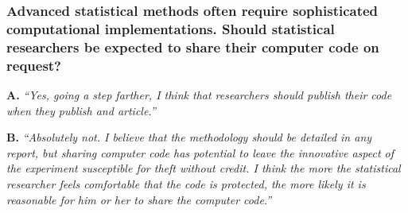 \documentclass[12pt]{beamer}
\newcommand\ans[1]{{\it ``#1''}}
\newcommand\gap{\vspace{5mm}}
\begin{document}
\begin{frame} %
  \frametitle{
    Advanced statistical methods often require sophisticated computational implementations. Should statistical researchers be expected to share their computer code on request?}


  
{\bf A. }  \ans{Yes, going a step farther, I think that researchers should publish their code when they publish and article.}
  
\gap
  
{\bf B. }  \ans{Absolutely not.  I believe that the methodology should be detailed in any report, but sharing computer code has potential to leave the innovative aspect of the experiment susceptible for theft without credit.  I think the more the statistical researcher feels comfortable that the code is protected, the more likely it is reasonable for him or her to share the computer code.}

\end{frame}
\end{document}
